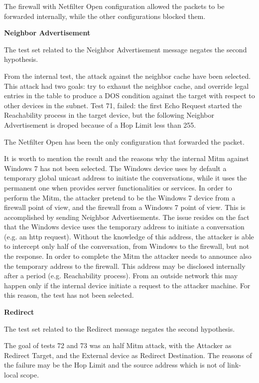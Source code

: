 \documentclass[12pt]{article}
\begin{document}
The firewall with Netfilter Open configuration allowed the packets to be forwarded internally, while the other configurations blocked them.

\textbf{Neighbor Advertisement}

The test set related to the Neighbor Advertisement message negates the second hypothesis.

From the internal test, the attack against the neighbor cache have been selected. This attack had two goals: try to exhaust the neighbor cache, and override legal entries in the table to produce a DOS condition against the target with respect to other devices in the subnet. Test 71, failed: the first Echo Request started the Reachability process in the target device, but the following Neighbor Advertisement is droped because of a Hop Limit less than 255.

The Netfilter Open has been the only configuration that forwarded the packet.

It is worth to mention the result and the reasons why the internal Mitm against Windows 7 has not been selected. The Windows device uses by default a temporary global unicast address to initiate the conversations, while it uses the permanent one when provides server functionalities or services. In order to perform the Mitm, the attacker pretend to be the Windows 7 device from a firewall point of view, and the firewall from a Windows 7 point of view. This is accomplished by sending Neighbor Advertisements. The issue resides on the fact that the Windows device uses the temporary address to initiate a conversation (e.g. an http request). Without the knowledge of this address, the attacker is able to intercept only half of the conversation, from Windows to the firewall, but not the response. In order to complete the Mitm the attacker needs to announce also the temporary address to the firewall. This address may be disclosed internally after a period (e.g. Reachability process). From an outside network this may happen only if the internal device initiate a request to the attacker machine. For this reason, the test has not been selected.

\textbf{Redirect}

The test set related to the Redirect message negates the second hypothesis.

The goal of tests 72 and 73 was an half Mitm attack, with the Attacker as Redirect Target, and the External device as Redirect Destination. The reasons of the failure may be the Hop Limit and the source address which is not of link-local scope.
\end{document}
